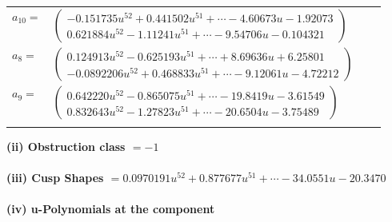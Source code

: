 \documentclass[1p]{elsarticle_modified}
\theoremstyle{definition}
\begin{document}
\begin{tabular}{m{7pt} m{180pt} m{7pt} m{180pt} }
\flushright $a_{10}=$&$\begin{pmatrix}-0.151735 u^{52}+0.441502 u^{51}+\cdots-4.60673 u-1.92073\\0.621884 u^{52}-1.11241 u^{51}+\cdots-9.54706 u-0.104321\end{pmatrix}$ \\
\flushright $a_{8}=$&$\begin{pmatrix}0.124913 u^{52}-0.625193 u^{51}+\cdots+8.69636 u+6.25801\\-0.0892206 u^{52}+0.468833 u^{51}+\cdots-9.12061 u-4.72212\end{pmatrix}$ \\
\flushright $a_{9}=$&$\begin{pmatrix}0.642220 u^{52}-0.865075 u^{51}+\cdots-19.8419 u-3.61549\\0.832643 u^{52}-1.27823 u^{51}+\cdots-20.6504 u-3.75489\end{pmatrix}$\\&\end{tabular}
\flushleft \textbf{(ii) Obstruction class $= -1$}\\~\\
\flushleft \textbf{(iii) Cusp Shapes $= 0.0970191 u^{52}+0.877677 u^{51}+\cdots-34.0551 u-20.3470$}\\~\\
\newpage\renewcommand{\arraystretch}{1}
\flushleft \textbf{(iv) u-Polynomials at the component}\newline \\
\end{document}
